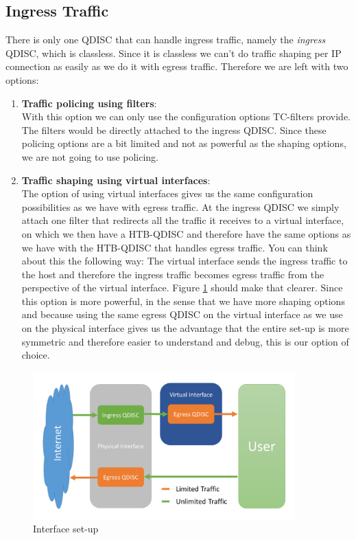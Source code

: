 \newpage
\subsection{Ingress Traffic} \label{Ingress Traffic}
There is only one \acs{QDISC} that can handle ingress traffic, namely the \textit{ingress} \acs{QDISC}, which is classless. Since it is classless we can't do traffic shaping per \acs{IP} connection as easily as we do it with egress traffic. Therefore we are left with two options:
\begin{enumerate}
\item \textbf{Traffic policing using filters}:
\\With this option we can only use the configuration options \acs{TC}-filters provide. The filters would be directly attached to the ingress \acs{QDISC}. Since these policing options are a bit limited and not as powerful as the shaping options, we are not going to use policing.
\item \textbf{Traffic shaping using virtual interfaces}:
\\The option of using virtual interfaces gives us the same configuration possibilities as we have with egress traffic. At the ingress \acs{QDISC} we simply attach one filter that redirects all the traffic it receives to a virtual interface, on which we then have a \acs{HTB}-\acs{QDISC} and therefore have the same options as we have with the \acs{HTB}-\acs{QDISC} that handles egress traffic. You can think about this the following way: The virtual interface sends the ingress traffic to the host and therefore the ingress traffic becomes egress traffic from the perspective of the virtual interface. Figure \ref{Interface set-up} should make that clearer. Since this option is more powerful, in the sense that we have more shaping options and because using the same egress \acs{QDISC} on the virtual interface as we use on the physical interface gives us the advantage that the entire set-up is more symmetric and therefore easier to understand and debug, this is our option of choice.

\end{enumerate}

\begin{figure}[h]
	\centering
	\includegraphics[width=0.9\textwidth]{img/Interface-Setup.png}
	\caption{Interface set-up}
	\label{Interface set-up}
\end{figure}